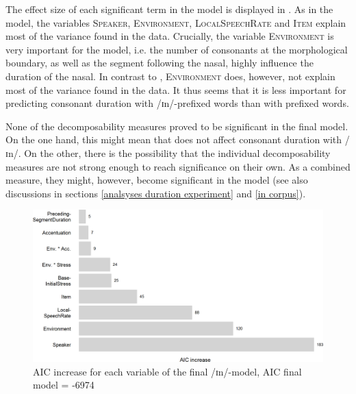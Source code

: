 
The effect size of each significant term in the model is displayed in . As in the model, the variables \textsc{Speaker}, \textsc{Environment}, \textsc{LocalSpeechRate} and \textsc{Item} explain most of the variance found in the data. Crucially, the variable \textsc{Environment} is very important for the model, i.e. the number of consonants at the morphological boundary, as well as the segment following the nasal, highly influence the duration of the nasal. In contrast to , \textsc{Environment} does, however, not explain most of the variance found in the data. It thus seems that it is less important for predicting consonant duration with /ɪn/-prefixed words than with prefixed words. 






None of the decomposability measures proved to be significant in the final model. On the one hand, this might mean that  does not affect consonant duration with /ɪn/. On the other, there is the possibility that the individual decomposability measures are not strong enough to reach significance on their own. As a combined  measure, they might, however, become significant in the model (see also discussions in sections \ref{analsyses duration experiment} and \ref {in corpus}).





\begin{figure}
	
	\includegraphics[scale=0.7]{images/Experiment/AICdecreaseInComplex.png}
	
	\caption{AIC increase for each variable of the final /ɪn/-model, AIC final model = -6974}
	\label{fig:Effect sizes InComplex Exp}
	
\end{figure}


